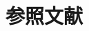 ﻿\documentclass[uplatex]{jsarticle}
\begin{document}
\maketitlepage%
\makedocumentseet%
\tableofcontents%
\clearpage
{}
\setcounter{page}{1}


\section*{参照文献}
\begin{thebibliography}{9}
\bibitem{}
\end{thebibliography}

\clearpage
\clearpage
\makeokuzuke
\end{document}
